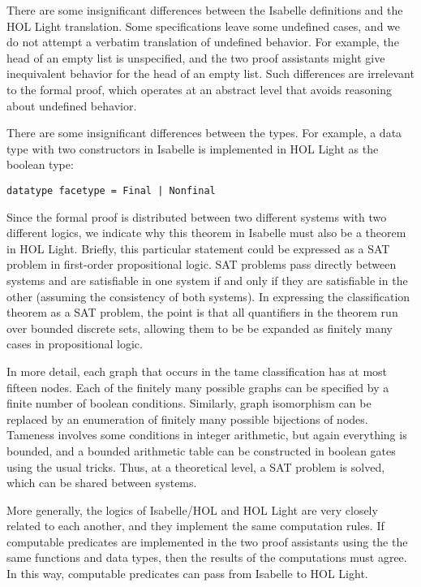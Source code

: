 There are some insignificant differences between the Isabelle
definitions and the HOL Light translation.  Some specifications leave
some undefined cases, and we do not attempt a verbatim translation of
undefined behavior.  For example, the head of an empty list is
unspecified, and the two proof assistants might give inequivalent
behavior for the head of an empty list.  Such differences are
irrelevant to the formal proof, which operates at an abstract level
that avoids reasoning about undefined behavior.  

There are some insignificant differences between the types.  For
example, a data type with two constructors in Isabelle
is implemented in HOL Light as the boolean type:
\begin{lstlisting}[keepspaces=true,stringstyle=\tt,basicstyle=\small,%
frame=none,framesep=8pt,mathescape,morekeywords={and,shows},columns=flexible]
datatype facetype = Final | Nonfinal
\end{lstlisting}


Since the formal proof is distributed between two different systems
with two different logics, we indicate why this theorem in
Isabelle must also be a theorem in HOL Light.  Briefly, this
particular statement could be expressed as a SAT problem in
first-order propositional logic.  SAT problems pass directly between
systems and are satisfiable in one system if and only if they are
satisfiable in the other (assuming the consistency of both systems).
In expressing the classification theorem as a SAT problem, the point
is that all quantifiers in the theorem run over bounded discrete sets,
allowing them to be be expanded as finitely many cases in
propositional logic.

In more detail, each graph that occurs in the tame classification has
at most fifteen nodes.  Each of the finitely many possible graphs
can be specified by a finite number of boolean conditions.  Similarly,
graph isomorphism can be replaced by an enumeration of finitely many
possible bijections of nodes.  Tameness involves some conditions in
integer arithmetic, but again everything is bounded, and a bounded
arithmetic table can be constructed in boolean gates using the usual
tricks.  Thus, at a theoretical level, a SAT problem is solved, which
can be shared between systems.

More generally, the logics of Isabelle/HOL and HOL Light are very
closely related to each another, and they implement the same
computation rules.  If computable predicates are implemented in the
two proof assistants using the the same functions and data types, then
the results of the computations must agree.  In this way, computable
predicates can pass from Isabelle to HOL Light.


